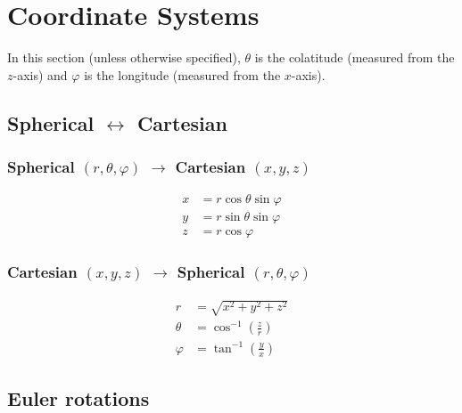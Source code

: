 \documentclass[twocolumn]{article}
\newcommand{\phase}{\varphi}
\begin{document}
\section{Coordinate Systems}

In this section (unless otherwise specified), $\theta$ is the colatitude (measured from the $z$-axis) and $\phase$ is the longitude (measured from the $x$-axis).

\subsection{Spherical $\leftrightarrow$ Cartesian}

\subsubsection*{Spherical $(r,\theta,\phase)$ $\rightarrow$ Cartesian $(x,y,z)$}
\begin{equation}
    \begin{aligned}
        x &= r \cos\theta\sin\phase \\
        y &= r \sin\theta\sin\phase \\
        z &= r \cos\phase
    \end{aligned}
\end{equation}
\subsubsection*{Cartesian $(x,y,z)$ $\rightarrow$ Spherical $(r,\theta,\phase)$}
\begin{equation}
    \begin{aligned}
        r &= \sqrt{x^2+y^2+z^2} \\
        \theta &= \cos^{-1} \left(\frac{z}{r}\right) \\
        \phase &= \tan^{-1} \left(\frac{y}{x}\right)
    \end{aligned}
\end{equation}

\subsection{Euler rotations}
\end{document}
